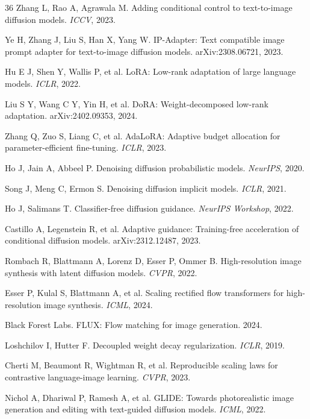 \documentclass[times,twocolumn,final]{elsarticle}
\begin{document}
\begin{thebibliography}{36}
Zhang L, Rao A, Agrawala M. Adding conditional control to text-to-image diffusion models. \textit{ICCV}, 2023.

Ye H, Zhang J, Liu S, Han X, Yang W. IP-Adapter: Text compatible image prompt adapter for text-to-image diffusion models. arXiv:2308.06721, 2023.


Hu E J, Shen Y, Wallis P, et al. LoRA: Low-rank adaptation of large language models. \textit{ICLR}, 2022.

Liu S Y, Wang C Y, Yin H, et al. DoRA: Weight-decomposed low-rank adaptation. arXiv:2402.09353, 2024.

Zhang Q, Zuo S, Liang C, et al. AdaLoRA: Adaptive budget allocation for parameter-efficient fine-tuning. \textit{ICLR}, 2023.

Ho J, Jain A, Abbeel P. Denoising diffusion probabilistic models. \textit{NeurIPS}, 2020.

Song J, Meng C, Ermon S. Denoising diffusion implicit models. \textit{ICLR}, 2021.

Ho J, Salimans T. Classifier-free diffusion guidance. \textit{NeurIPS Workshop}, 2022.

Castillo A, Legenstein R, et al. Adaptive guidance: Training-free acceleration of conditional diffusion models. arXiv:2312.12487, 2023.

Rombach R, Blattmann A, Lorenz D, Esser P, Ommer B. High-resolution image synthesis with latent diffusion models. \textit{CVPR}, 2022.

Esser P, Kulal S, Blattmann A, et al. Scaling rectified flow transformers for high-resolution image synthesis. \textit{ICML}, 2024.

Black Forest Labs. FLUX: Flow matching for image generation. 2024.

Loshchilov I, Hutter F. Decoupled weight decay regularization. \textit{ICLR}, 2019.

Cherti M, Beaumont R, Wightman R, et al. Reproducible scaling laws for contrastive language-image learning. \textit{CVPR}, 2023.

Nichol A, Dhariwal P, Ramesh A, et al. GLIDE: Towards photorealistic image generation and editing with text-guided diffusion models. \textit{ICML}, 2022.


\end{thebibliography}
\end{document}
